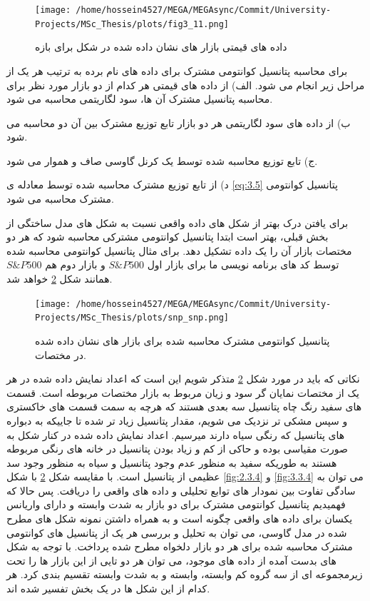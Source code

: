 \documentclass[a4paper,titlepage,12pt,fleqn,oneside]{report}
\begin{document}
 \begin{figure}[ptb]
 	\centering
 	\texttt{[image: /home/hossein4527/MEGA/MEGAsync/Commit/University-Projects/MSc\_Thesis/plots/fig3\_11.png]}
 	\caption{داده های قیمتی بازار های نشان داده شده در شکل برای بازه}
 	\label{fig:11}
 \end{figure}
برای محاسبه پتانسیل کوانتومی مشترک برای داده های نام برده به ترتیب هر یک از مراحل زیر انجام می شود. 
الف) از داده های قیمتی هر کدام از دو بازار مورد نظر برای محاسبه پتانسیل مشترک آن ها، سود لگاریتمی محاسبه می شود.

ب) از داده های سود لگاریتمی هر دو بازار تابع توزیع مشترک بین آن دو محاسبه می شود. 

ج) تابع توزیع محاسبه شده توسط یک کرنل گاوسی صاف و هموار می شود.

د) از تابع توزیع مشترک محاسبه شده توسط معادله ی 
\ref{eq:3.5}
پتانسیل کوانتومی مشترک محاسبه می شود. 

برای یافتن درک بهتر از شکل های داده واقعی نسبت به شکل های مدل ساختگی از بخش قبلی، بهتر است ابتدا پتانسیل کوانتومی مشترکی محاسبه شود که هر دو مختصات بازار آن را یک داده تشکیل دهد. برای مثال پتانسیل کوانتومی محاسبه شده توسط کد های برنامه نویسی ما برای بازار اول
$S\&P500$
و بازار دوم هم
$S\&P500$
همانند شکل 
\ref{fig:12}
خواهد شد.
 \begin{figure}[ptb]
	\centering
	\texttt{[image: /home/hossein4527/MEGA/MEGAsync/Commit/University-Projects/MSc\_Thesis/plots/snp\_snp.png]}
	\caption{پتانسیل کوانتومی مشترک محاسبه شده برای بازار های نشان داده شده در مختصات.}
	\label{fig:12}
\end{figure}
نکاتی که باید در مورد شکل 
\ref{fig:12}
متذکر شویم این است که اعداد نمایش داده شده در هر یک از مختصات نمایان گر سود و زیان مربوط به بازار مختصات مربوطه است. قسمت های سفید رنگ چاه پتانسیل سه بعدی هستند که هرچه به سمت قسمت های خاکستری و سپس مشکی تر نزدیک می شویم، مقدار پتانسیل زیاد تر شده تا جاییکه به دبواره های پتانسیل که رنگی سیاه دارند میرسیم. اعداد نمایش داده شده در کنار شکل به صورت مقیاسی بوده و حاکی از کم و زیاد بودن پتانسیل در خانه های رنگی مربوطه هستند به طوریکه سفید به منظور عدم وجود پتانسیل و سیاه به منظور وجود سد عظیمی از پتانسیل است. 
با مقایسه شکل 
\ref*{fig:12}
با شکل
\ref{fig:2.3.4} 
و 
\ref{fig:3.3.4}
می توان به سادگی تفاوت بین نمودار های توابع تحلیلی و داده های واقعی را دریافت.
پس حالا که فهمیدیم پتانسیل کوانتومی مشترک برای دو بازار به شدت وابسته و دارای واریانس یکسان برای داده های واقعی چگونه است و به همراه داشتن نمونه شکل های مطرح شده در مدل گاوسی، می توان به تحلیل و بررسی هر یک از پتانسیل های کوانتومی مشترک محاسبه شده برای هر دو بازار دلخواه مطرح شده پرداخت.
با توجه به شکل های بدست آمده از داده های موجود، می توان هر دو تایی از این بازار ها را تحت زیرمجموعه ای از سه گروه کم وابسته، وابسته و به شدت وابسته تقسیم بندی کرد. 
هر کدام از این شکل ها در یک بخش تفسیر شده اند.
\end{document}
